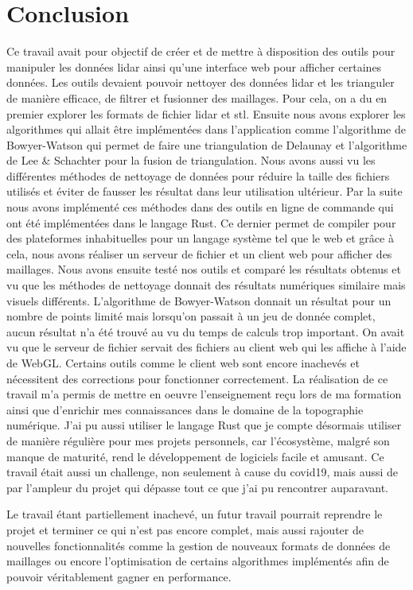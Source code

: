 \chapter*{Conclusion}

Ce travail avait pour objectif de créer et de mettre à disposition des outils pour manipuler les données \gls{lidar} ainsi qu'une interface web pour afficher certaines données.
Les outils devaient pouvoir nettoyer des données \gls{lidar} et les trianguler de manière efficace, de filtrer et fusionner des maillages.
Pour cela, on a du en premier explorer les formats de fichier \gls{lidar} et
\gls{stl}.
Ensuite nous avons explorer les algorithmes qui allait être implémentées dans
l'application comme l'algorithme de Bowyer-Watson qui permet de faire une
triangulation de Delaunay et l'algorithme de Lee \& Schachter pour la fusion de
triangulation. Nous avons aussi vu les différentes méthodes de nettoyage de
données pour réduire la taille des fichiers utilisés et éviter de fausser les
résultat dans leur utilisation ultérieur. Par la suite nous avons implémenté ces
méthodes dans des outils en ligne de commande qui ont été implémentées dans le langage Rust.
Ce dernier permet de compiler pour des plateformes inhabituelles pour un langage système tel que le web et grâce à cela,
nous avons réaliser un serveur de fichier et un client web pour afficher des
maillages.
Nous avons ensuite testé nos outils et comparé les résultats obtenus et
vu que les méthodes de nettoyage donnait des résultats numériques similaire mais
visuels différents. L'algorithme de Bowyer-Watson donnait un résultat pour
un nombre de points limité mais lorsqu'on passait à un jeu de donnée complet, aucun
résultat n'a été trouvé au vu du temps de calculs trop important. 
On avait vu que le serveur de fichier servait des fichiers au client web qui les
affiche à l'aide de WebGL.
Certains outils comme le client web sont encore inachevés et nécessitent des corrections pour fonctionner correctement.
La réalisation de ce travail m'a permis de mettre en oeuvre l'enseignement reçu lors de ma formation ainsi que d'enrichir mes connaissances dans le domaine de la topographie numérique.
J'ai pu aussi utiliser le langage Rust que je compte désormais utiliser de manière régulière pour mes projets personnels, car l'écosystème, malgré son manque de maturité, rend le développement de logiciels facile et amusant.
Ce travail était aussi un challenge, non seulement à cause du covid19, mais aussi de par l'ampleur du projet qui dépasse tout ce que j'ai pu rencontrer auparavant.

Le travail étant partiellement inachevé, un futur travail pourrait reprendre le projet et
terminer ce qui n'est pas encore complet, mais aussi rajouter de nouvelles
fonctionnalités comme la gestion de nouveaux formats de données de maillages ou encore l'optimisation de certains algorithmes implémentés 
afin de pouvoir véritablement gagner en performance.
